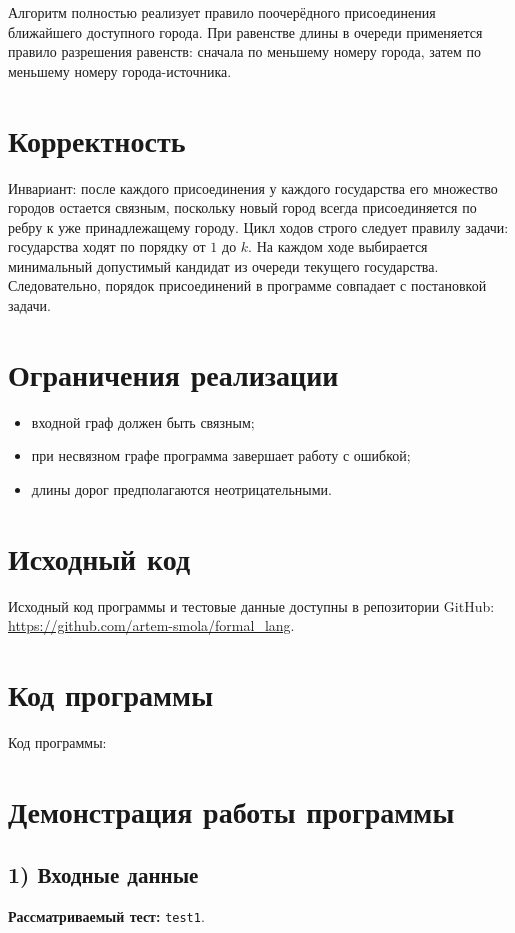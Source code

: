 \documentclass[12pt,a4paper]{article}
\begin{document}
Алгоритм полностью реализует правило поочерёдного присоединения ближайшего доступного города.
При равенстве длины в очереди применяется правило разрешения равенств:
сначала по меньшему номеру города, затем по меньшему номеру города-источника.

\section{Корректность}
Инвариант: после каждого присоединения у каждого государства его множество городов
остается связным, поскольку новый город всегда присоединяется по ребру к уже принадлежащему городу.
Цикл ходов строго следует правилу задачи: государства ходят по порядку от $1$ до $k$.
На каждом ходе выбирается минимальный допустимый кандидат из очереди текущего государства.
Следовательно, порядок присоединений в программе совпадает с постановкой задачи.

\section{Ограничения реализации}
\begin{itemize}
    \item входной граф должен быть связным;
    \item при несвязном графе программа завершает работу с ошибкой;
    \item длины дорог предполагаются неотрицательными.
\end{itemize}

\section{Исходный код}
Исходный код программы и тестовые данные доступны в репозитории GitHub:
\url{https://github.com/artem-smola/formal_lang}.

\section{Код программы}

Код программы:

{\small
{}
}

\section{Демонстрация работы программы}
\subsection*{1) Входные данные}
\textbf{Рассматриваемый тест:} \texttt{test1}.
\end{document}
